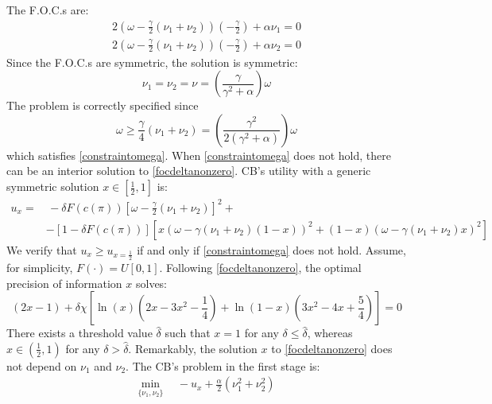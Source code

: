 \documentclass[12pt,a4paper]{article}
\begin{document}
The F.O.C.s are:
\begin{eqnarray}
2\left(\omega-\frac{\gamma}{2}(\nu_1+\nu_2)\right)\left(-\frac{\gamma}{2}\right)+\alpha \nu_1=0\\
2\left(\omega-\frac{\gamma}{2}(\nu_1+\nu_2)\right)\left(-\frac{\gamma}{2}\right)+\alpha \nu_2=0
\end{eqnarray}
Since the F.O.C.s are symmetric, the solution is symmetric:
\begin{equation}
\label{optflex}
    \nu_1=\nu_2=\nu=\left(\frac{\gamma}{\gamma^2+\alpha}\right)\omega
\end{equation}
The problem is correctly specified since
\begin{equation}
    \omega\geq\frac{\gamma}{4} (\nu_1+\nu_2)=\left(\frac{\gamma^2}{2(\gamma^2+\alpha)}\right)\omega 
\end{equation}
which satisfies \eqref{constraintomega}. When \eqref{constraintomega} does not hold, there can be an interior solution to \eqref{focdeltanonzero}. CB's utility with a generic symmetric solution $x\in\left[\frac{1}{2},1\right]$ is:
\begin{equation}
    \begin{split}
        u_{x}= & \, -\delta F(c(\pi))\left[\omega-\frac{\gamma}{2}(\nu_1+\nu_2)\right]^2+\\
        & -[1-\delta F(c(\pi))]\left[x(\omega-\gamma(\nu_1+\nu_2)(1-x))^2+(1-x)(\omega-\gamma(\nu_1+\nu_2)x)^2\right]
    \end{split}
\end{equation}
We verify that $u_x\geq u_{x=\frac{1}{2}}$ if and only if \eqref{constraintomega} does not hold. Assume, for simplicity, $F(\cdot)=U[0,1]$. Following \eqref{focdeltanonzero}, the optimal precision of information $x$ solves:
\begin{equation}
    [1-\delta\chi\ln(2)](2x-1)+\delta\chi \left[\ln(x)\left(2x-3x^2-\frac{1}{4}\right)+\ln(1-x)\left(3x^2-4x+\frac{5}{4}\right)\right]=0
\end{equation}
There exists a threshold value $\hat{\delta}$ such that $x=1$ for any $\delta\leq \hat{\delta}$, whereas $x\in\left(\frac{1}{2},1\right)$ for any $\delta>\hat{\delta}$. Remarkably, the solution $x$ to \eqref{focdeltanonzero} does not depend on $\nu_1$ and $\nu_2$. The CB's problem in the first stage is:
\begin{equation}
    \begin{split}
    \min_{\{\nu_1,\nu_2\}} \ & \ -u_x
    +\frac{\alpha}{2}(\nu_1^2+\nu_2^2)
    \end{split}
\end{equation}
\end{document}
